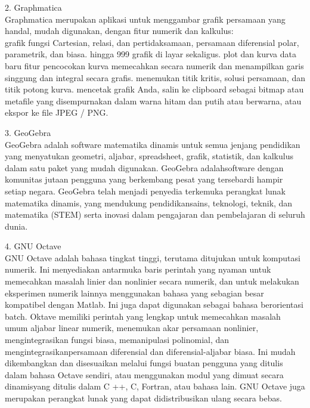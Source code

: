 \documentclass[a4paper,10pt]{article}
\begin{document}
\begin{eulernotebook}
\begin{eulercomment}
2. Graphmatica\\
Graphmatica merupakan aplikasi untuk menggambar grafik persamaan yang handal,
mudah digunakan, dengan fitur numerik dan kalkulus:\\
grafik fungsi Cartesian, relasi, dan pertidaksamaan, persamaan diferensial
polar, parametrik, dan biasa. hingga 999 grafik di layar sekaligus. plot dan
kurva data baru fitur pencocokan kurva memecahkan secara numerik dan
menampilkan garis singgung dan integral secara grafis. menemukan titik kritis,
solusi persamaan, dan titik potong kurva. mencetak grafik Anda, salin ke
clipboard sebagai bitmap atau metafile yang disempurnakan dalam warna hitam
dan putih atau berwarna, atau ekspor ke file JPEG / PNG. 

3. GeoGebra\\
GeoGebra adalah software matematika dinamis untuk semua jenjang pendidikan
yang menyatukan geometri, aljabar, spreadsheet, grafik, statistik, dan
kalkulus dalam satu paket yang mudah digunakan. GeoGebra adalahsoftware dengan
komunitas jutaan pengguna yang berkembang pesat yang tersebardi hampir setiap
negara. GeoGebra telah menjadi penyedia terkemuka perangkat lunak matematika
dinamis, yang mendukung pendidikansains, teknologi, teknik, dan matematika
(STEM) serta inovasi dalam pengajaran dan pembelajaran di seluruh dunia. 

4. GNU Octave \\
GNU Octave adalah bahasa tingkat tinggi, terutama ditujukan untuk komputasi
numerik. Ini menyediakan antarmuka baris perintah yang nyaman untuk memecahkan
masalah linier dan nonlinier secara numerik, dan untuk melakukan eksperimen
numerik lainnya menggunakan bahasa yang sebagian besar kompatibel dengan
Matlab. Ini juga dapat digunakan sebagai bahasa berorientasi batch. Oktave
memiliki perintah yang lengkap untuk memecahkan masalah umum aljabar linear
numerik, menemukan akar persamaan nonlinier, mengintegrasikan fungsi biasa,
memanipulasi polinomial, dan mengintegrasikanpersamaan diferensial dan
diferensial-aljabar biasa. Ini mudah dikembangkan dan disesuaikan melalui
fungsi buatan pengguna yang ditulis dalam bahasa Octave sendiri, atau
menggunakan modul yang dimuat secara dinamisyang ditulis dalam C ++, C,
Fortran, atau bahasa lain. GNU Octave juga merupakan perangkat lunak yang
dapat didistribusikan ulang secara bebas. 


\end{eulercomment}
\end{eulernotebook}
\end{document}
